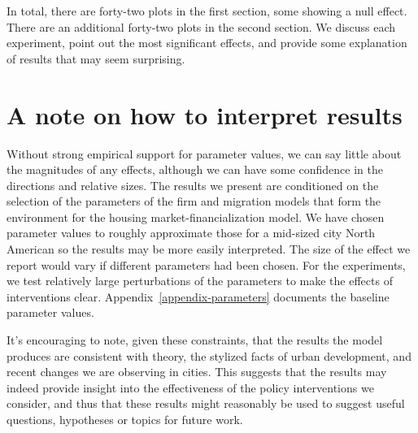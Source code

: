 In total, there are forty-two plots in the first section, some showing a null effect. There are an additional forty-two plots in the second section. We discuss each experiment, point out the most significant effects, and provide some explanation of results that may seem surprising.  

\section{A note on how to interpret results}

Without strong empirical support for parameter values, we can say little about the magnitudes of any effects, although we can have some confidence in the directions and relative sizes.  
The results we present are conditioned on the selection of the parameters of the firm and migration models that form the environment for the housing market-financialization model. We have chosen parameter values to roughly approximate those for a mid-sized city North American so the results may be more easily interpreted. The size of the effect we report would vary if different parameters had been chosen. %
For the experiments, we test relatively large perturbations of the parameters to make the effects of interventions clear. Appendix~\ref{appendix-parameters} documents the baseline parameter values. 

It's encouraging to note, given these constraints, that the results the model produces are consistent with theory, the stylized facts of urban development, and recent changes we are observing in cities. 
This suggests that the results may indeed provide insight into the effectiveness of the policy interventions we consider, and thus that these results might reasonably be used to suggest useful questions, hypotheses or topics for future work. 

